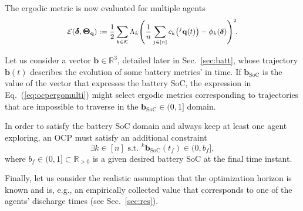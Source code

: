\documentclass[letterpaper,10pt,conference,twoside]{IEEEtran}
\theoremstyle{definition}
\begin{document}
The ergodic metric is now evaluated for multiple agents\vspace*{-.1cm}
\begin{equation}\label{eq:multiergometric}
  \mathcal{E}(\boldsymbol{\delta},\boldsymbol{\Theta}_{\mathbf{q}}):={\small
  \frac{1}{2}
  \sum_{k\in\mathcal{K}}\Lambda_k 
    \Bigg(
      \frac{1}{n}\sum_{j\in[n]} c_k\big({}^j\mathbf{q}(t)\big)-\phi_k(\boldsymbol{\delta})
    \Bigg)^2\hspace*{-.5ex}.}
\end{equation}
\vspace*{-.2cm}

Let us consider a vector $\mathbf{b}\in\mathbb{R}^3$, detailed later in Sec.~\ref{sec:batt}, whose trajectory $\mathbf{b}(t)$ describes the evolution of some battery metrics' in time. If $\mathbf{b}_{\text{SoC}}$ is the value of the vector that expresses the battery %
SoC, the expression in Eq.~(\ref{eq:ocpergomulti}) might select ergodic metrics corresponding to trajectories that are impossible to traverse in the $\mathbf{b}_{\text{SoC}}\in(0,1]$ domain.%

In order to satisfy the battery SoC domain and always keep at least one agent exploring, an OCP must satisfy an additional constraint
\begin{equation}\label{eq:ocpbattconst}
  \exists k\in[n]\text{ s.t. }{}^k\mathbf{b}_{\text{SoC}}(t_f)\in(0,b_f],
\end{equation}
where $b_f\in(0,1]\subset\mathbb{R}_{>0}$ is a given desired battery SoC at the final time instant.

Finally, let us consider the realistic assumption that the optimization horizon %
is known and is,
e.g., an empirically collected value that corresponds to one of the agents' discharge times (see Sec.~\ref{sec:res}).
\end{document}

